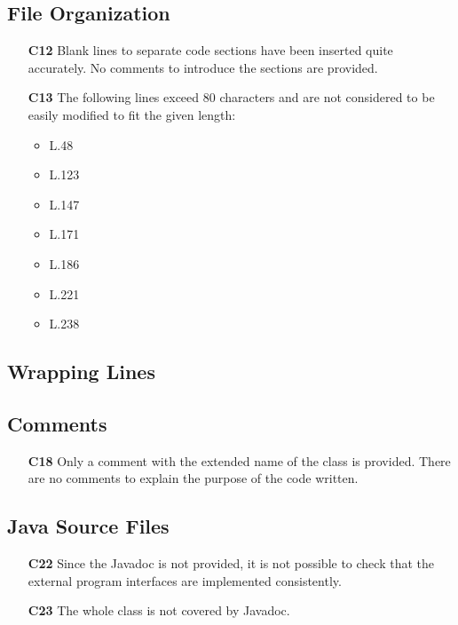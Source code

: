 \subsection{File Organization}
	\begin{itemize}
		\item[\textbf{C12}] Blank lines to separate code sections have been inserted quite accurately. No comments to introduce the sections are provided.
		\item[\textbf{C13}] The following lines exceed 80 characters and are not considered to be easily modified to fit the given length:
		\begin{itemize}
			\item L.48
			\item L.123
			\item L.147
			\item L.171
			\item L.186
			\item L.221
			\item L.238
		\end{itemize}
	\end{itemize}

\subsection{Wrapping Lines}
\blindtext

\subsection{Comments}
	\begin{itemize}
		\item[\textbf{C18}] Only a comment with the extended name of the class is provided. There are no comments to explain the purpose of the code written.
	\end{itemize}

\subsection{Java Source Files}
	\begin{itemize}
		\item[\textbf{C22}] Since the Javadoc is not provided, it is not possible to check that the external program interfaces are implemented consistently.
		\item[\textbf{C23}] The whole class is not covered by Javadoc.
	\end{itemize}


